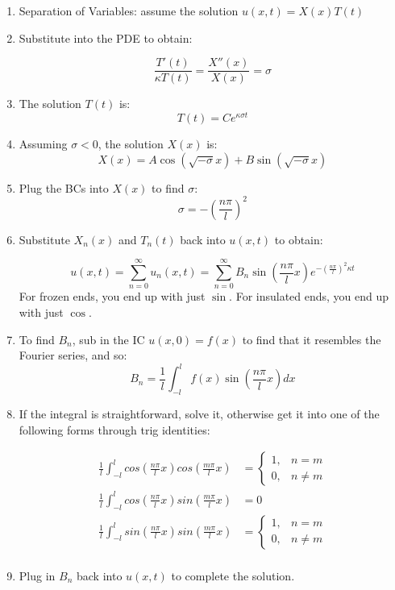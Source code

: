 \documentclass[11pt]{article}
\begin{document}
\begin{enumerate}

\item Separation of Variables: assume the solution $u(x,t) = X(x)T(t)$
\item Substitute into the PDE to obtain:

$$ \frac{T'(t)}{\kappa T(t)} = \frac{X''(x)}{X(x)} = \sigma $$

\item The solution $T(t)$ is:
$$ T(t) = Ce^{\kappa \sigma t}$$

\item Assuming $\sigma < 0$, the solution $X(x)$ is:
$$ X(x) = A\cos(\sqrt{-\sigma}x) + B\sin(\sqrt{-\sigma}x) $$

\item Plug the BCs into $X(x)$ to find $\sigma$:
$$ \sigma = -(\frac{n\pi}{l})^2 $$
\item Substitute $X_n(x)$ and $T_n(t)$ back into $u(x,t)$ to obtain:

$$ u(x,t) = \sum \limits_{n=0}^{\infty} u_n(x,t) = \sum \limits_{n=0}^{\infty} B_n \sin(\frac{n\pi}{l}x)e^{-(\frac{n\pi}{l})^2\kappa t}$$
For frozen ends, you end up with just $\sin$. For insulated ends, you end up with just $\cos$.

\item To find $B_n$, sub in the IC $u(x,0)=f(x)$ to find that it resembles the Fourier series, and so:
$$ B_n = \frac{1}{l} \int_{-l}^{l} f(x) \sin(\frac{n\pi}{l}x) dx$$

\item If the integral is straightforward, solve it, otherwise get it into one of the following forms through trig identities:

\begin{align*}
	\frac{1}{l} \int_{-l}^{l} cos(\frac{n\pi}{l}x)cos(\frac{m\pi}{l}x) &=
		\begin{cases}
			1, & n=m \\
			0, & n\neq m
		\end{cases}\\
\frac{1}{l} \int_{-l}^{l} cos(\frac{n\pi}{l}x)sin(\frac{m\pi}{l}x) &= 0 \\
\frac{1}{l} \int_{-l}^{l} sin(\frac{n\pi}{l}x)sin(\frac{m\pi}{l}x) &=
		\begin{cases}
			1, & n=m \\
			0, & n\neq m
		\end{cases}\\
\end{align*}

\item Plug in $B_n$ back into $u(x,t)$ to complete the solution.

\end{enumerate}
\end{document}
